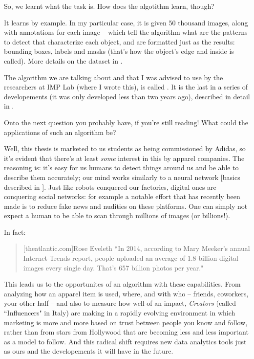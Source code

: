 So, we learnt what the task is. How does the algotithm learn, though?

It learns by example. In my particular case, it is given 50 thousand images, along with annotations for each image -- which tell the algorithm what are the patterns to detect that characterize each object, and are formatted just as the results: bounding boxes, labels and masks (that's how the object's edge and inside is called). More details on the dataset in \modanet.

The algorithm we are talking about and that I was advised to use by the researchers at IMP Lab (where I wrote this), is called \maskrcnn. It is the last in a series of developements (it was only developed less than two years ago), described in detail in .

Onto the next question you probably have, if you're still reading!
What could the applications of such an algorithm be?

Well, this thesis is marketed to us students as being commissioned by Adidas, so it's evident that there's at least \emph{some} interest in this by apparel companies.
The reasoning is: it's easy for us humans to detect things around us and be able to describe them accurately; our mind works similarly to a neural network [basics described in ].
Just like robots conquered our factories, digital ones are conquering social networks:
for example a notable effort that has recently been made is to reduce fake news and nudities on these platforms. One can simply not expect a human to be able to scan through millions of images (or billions!). 

In fact:
\begin{quote}[theatlantic.com]{Rose Eveleth}
	“In 2014, according to Mary Meeker's annual Internet Trends report, people uploaded an average of 1.8 billion digital images every single day. That's 657 billion photos per year."
\end{quote}

This leads us to the opportunites of an algorithm with these capabilities.
From analyzing how an apparel item is used, where, and with who -- friends, coworkers, your other half -- and also to measure how well of an impact, \emph{Creators} (called “Influencers" in Italy) are making in a rapidly evolving environment in which marketing is more and more based on trust between people you know and follow, rather than from stars from Hollywood that are becoming less and less important as a model to follow.
And this radical shift requires new data analytics tools just as ours and the developements it will have in the future.


